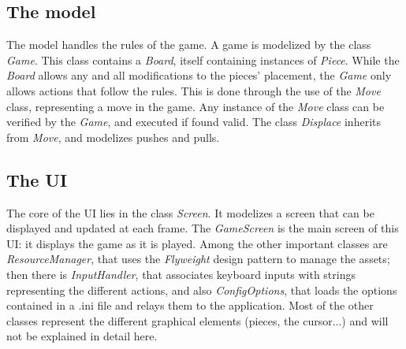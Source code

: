 \subsection{The model}

The model handles the rules of the game.
A game is modelized by the class \emph{Game}.
This class contains a \emph{Board}, itself containing instances of \emph{Piece}.
While the \emph{Board} allows any and all modifications to the pieces' placement, the \emph{Game} only allows actions that follow the rules.
This is done through the use of the \emph{Move} class, representing a move in the game.
Any instance of the \emph{Move} class can be verified by the \emph{Game}, and executed if found valid.
The class \emph{Displace} inherits from \emph{Move}, and modelizes pushes and pulls.

\subsection{The UI}

The core of the UI lies in the class \emph{Screen}.
It modelizes a screen that can be displayed and updated at each frame.
The \emph{GameScreen} is the main screen of this UI: it displays the game as it is played.
Among the other important classes are \emph{ResourceManager}, that uses the \emph{Flyweight} design pattern to manage the assets;
then there is \emph{InputHandler}, that associates keyboard inputs with strings representing the different actions,
and also \emph{ConfigOptions}, that loads the options contained in a .ini file and relays them to the application.
Most of the other classes represent the different graphical elements (pieces, the cursor...) and will not be explained in detail here.
